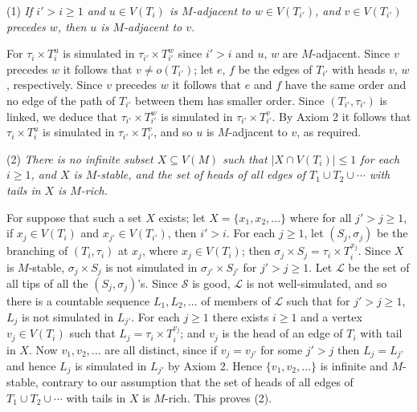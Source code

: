 \hspace*{12pt}(1) \textit{If $i' > i \ge 1$ and $u \in V(T_i)$ is $M$-adjacent to $w \in V(T_{i'})$, and $v \in V(T_{i'})$ precedes $w$, then $u$ is $M$-adjacent to $v$.}

For $\tau_i \times T_i^u$ is simulated in $\tau_{i'} \times T_{i'}^w$ since $i' > i$ and $u$, $w$ are $M$-adjacent. Since $v$ precedes $w$ it follows that $v \ne o(T_{i'})$; let $e$, $f$ be the edges of $T_{i'}$ with heads $v$, $w$, respectively. Since $v$ precedes $w$ it follows that $e$ and $f$ have the same order and no edge of the path of $T_{i'}$ between them has smaller order. Since $(T_{i'}, \tau_{i'})$ is linked, we deduce that $\tau_{i'} \times T_{i'}^w$ is simulated in $\tau_{i'} \times T_{i'}^v$. By Axiom 2 it follows that $\tau_i \times T_i^u$ is simulated in $\tau_{i'} \times T_{i'}^v$, and so $u$ is $M$-adjacent to $v$, as required.

\hspace*{12pt}(2) \textit{There is no infinite subset $X \subseteq V(M)$ such that $|X \cap V(T_i)| \le 1$ for each $i \ge 1$, and $X$ is $M$-stable, and the set of heads of all edges of $T_1 \cup T_2 \cup \cdots$ with tails in $X$ is $M$-rich.}

For suppose that such a set $X$ exists; let $X = \{x_1, x_2, ...\}$ where for all $j' > j \ge 1$, if $x_j \in V(T_i)$ and $x_{j'} \in V(T_{i'})$, then $i' > i$. For each $j \ge 1$, let $(S_j, \sigma_j)$ be the branching of $(T_i, \tau_i)$ at $x_j$, where $x_j \in V(T_i)$; then $\sigma_j \times S_j = \tau_i \times T_i^{x_j}$. Since $X$ is $M$-stable, $\sigma_j \times S_j$ is not simulated in $\sigma_{j'} \times S_{j'}$ for $j' > j \ge 1$. Let $\mathscr{L}$ be the set of all tips of all the $(S_j, \sigma_j)$'s. Since $\mathscr{S}$ is good, $\mathscr{L}$ is not well-simulated, and so there is a countable sequence $L_1, L_2, ...$ of members of $\mathscr{L}$ such that for $j' > j \ge 1$, $L_j$ is not simulated in $L_{j'}$. For each $j \ge 1$ there exists $i \ge 1$ and a vertex $v_j \in V(T_i)$ such that $L_j = \tau_i \times T_i^{v_j}$; and $v_j$ is the head of an edge of $T_i$ with tail in $X$. Now $v_1, v_2, ...$ are all distinct, since if $v_j = v_{j'}$ for some $j' > j$ then $L_j = L_{j'}$ and hence $L_j$ is simulated in $L_{j'}$ by Axiom 2. Hence $\{v_1, v_2, ...\}$ is infinite and $M$-stable, contrary to our assumption that the set of heads of all edges of $T_1 \cup T_2 \cup \cdots$ with tails in $X$ is $M$-rich. This proves (2).

